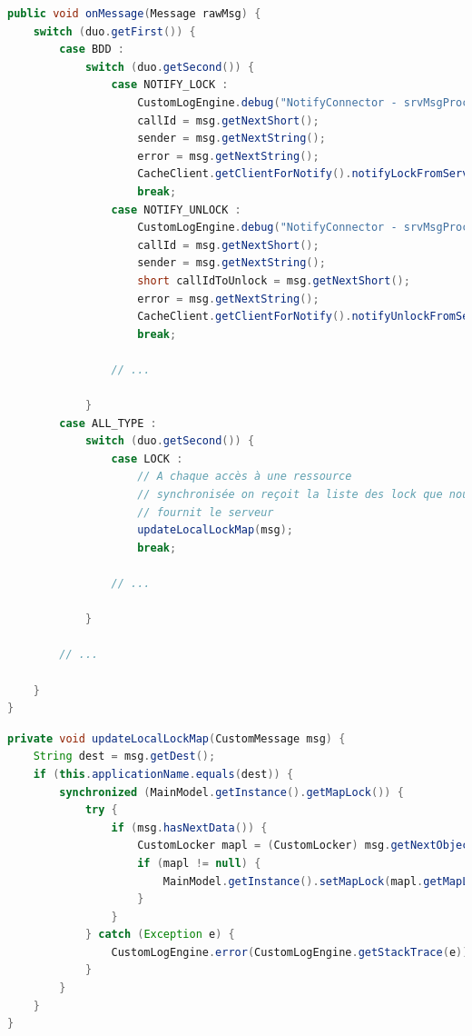 \begin{minipage}{\linewidth}
	\begin{lstlisting}[language=Java, caption="Gestion des verrous à la réception d'un message côté client", label={lst:lock_un}]
public void onMessage(Message rawMsg) {
    switch (duo.getFirst()) {
        case BDD :
            switch (duo.getSecond()) {
                case NOTIFY_LOCK :
                    CustomLogEngine.debug("NotifyConnector - srvMsgProcess : notify lock");
                    callId = msg.getNextShort();
                    sender = msg.getNextString();
                    error = msg.getNextString();
                    CacheClient.getClientForNotify().notifyLockFromServer(error, callId);
                    break;
                case NOTIFY_UNLOCK :
                    CustomLogEngine.debug("NotifyConnector - srvMsgProcess : notify lock");
                    callId = msg.getNextShort();
                    sender = msg.getNextString();
                    short callIdToUnlock = msg.getNextShort();
                    error = msg.getNextString();
                    CacheClient.getClientForNotify().notifyUnlockFromServer(error, callIdToUnlock, callId); 
                    break;

                // ...

            }
        case ALL_TYPE :
            switch (duo.getSecond()) {
                case LOCK :
                    // A chaque accès à une ressource
                    // synchronisée on reçoit la liste des lock que nous
                    // fournit le serveur
                    updateLocalLockMap(msg);
                    break;

                // ...

            }

        // ...
                
    }
}
    \end{lstlisting}
\end{minipage}

\begin{minipage}{\linewidth}
	\begin{lstlisting}[language=Java, caption="Méthode permettant de mettre à jour les ressources verrouillées", label={lst:lock_deux}]
private void updateLocalLockMap(CustomMessage msg) {
    String dest = msg.getDest();
    if (this.applicationName.equals(dest)) {
        synchronized (MainModel.getInstance().getMapLock()) {
            try {
                if (msg.hasNextData()) {
                    CustomLocker mapl = (CustomLocker) msg.getNextObject();
                    if (mapl != null) {
                        MainModel.getInstance().setMapLock(mapl.getMapLock());
                    }
                }
            } catch (Exception e) {
                CustomLogEngine.error(CustomLogEngine.getStackTrace(e));
            }
        }
    }
}
    \end{lstlisting}
\end{minipage}

